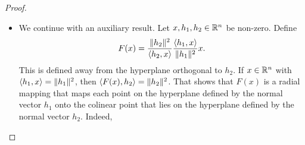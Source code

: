 \documentclass[10pt,a4paper]{article}
\begin{document}
\begin{proof}
\begin{itemize}
        
        \item 
        We continue with an auxiliary result.
        Let $x, h_1, h_2 \in {\mathbb R}^{n}$ be non-zero. 
        Define 
        \begin{align*}
            F(x) 
            = 
            \frac{ \| h_2 \|^{2} }{ \langle h_2, x \rangle }
            \frac{ \langle h_1, x \rangle }{ \|  h_1  \|^{2} }
            x
            .
        \end{align*}
        This is defined away from the hyperplane orthogonal to $h_2$.
        If $x \in {\mathbb R}^{n}$ with $\langle h_1, x \rangle = \|  h_1  \|^{2}$, then $\langle F(x), h_2 \rangle = \|  h_2  \|^{2}$.
        That shows that $F(x)$ is a radial mapping that maps each point on the hyperplane defined by the normal vector $h_1$
        onto the colinear point that lies on the hyperplane defined by the normal vector $h_2$. Indeed, 
        

\end{itemize}
\end{proof}
\end{document}
